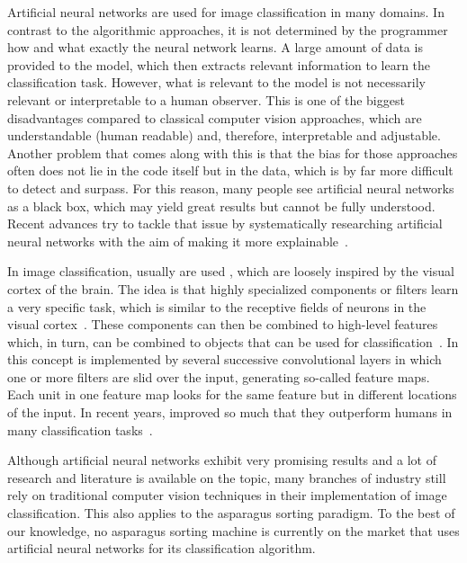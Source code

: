 \bigskip
Artificial neural networks are used for image classification in many domains. In contrast to the algorithmic approaches, it is not determined by the programmer how and what exactly the neural network learns. A large amount of data is provided to the model, which then extracts relevant information to learn the classification task. However, what is relevant to the model is not necessarily relevant or interpretable to a human observer. This is one of the biggest disadvantages compared to classical computer vision approaches, which are understandable (human readable) and, therefore, interpretable and adjustable. Another problem that comes along with this is that the bias for those approaches often does not lie in the code itself but in the data, which is by far more difficult to detect and surpass. For this reason, many people see artificial neural networks as a black box, which may yield great results but cannot be fully understood. Recent advances try to tackle that issue by systematically researching artificial neural networks with the aim of making it more explainable~\citep{tjoa2019survey,gilpin2018explaining}.

In image classification, usually  are used \citep{geron2019hands,lecun1995convolutional}, which are loosely inspired by the visual cortex of the brain. The idea is that highly specialized components or filters learn a very specific task, which is similar to the receptive fields of neurons in the visual cortex~\citep{hubel1962receptive}. These components can then be combined to high-level features which, in turn, can be combined to objects that can be used for classification~\citep{geron2019hands,bishop2006pattern,lecun1995convolutional}. In  this concept is implemented by several successive convolutional layers in which one or more filters are slid over the input, generating so-called feature maps. Each unit in one feature map looks for the same feature but in different locations of the input. In recent years,  improved so much that they outperform humans in many classification tasks~\citep{russakovsky2015imagenet,KarpathyConvNet}.

\bigskip
Although artificial neural networks exhibit very promising results and a lot of research and literature is available on the topic, many branches of industry still rely on traditional computer vision techniques in their implementation of image classification. This also applies to the asparagus sorting paradigm. To the best of our knowledge, no asparagus sorting machine is currently on the market that uses artificial neural networks for its classification algorithm.

